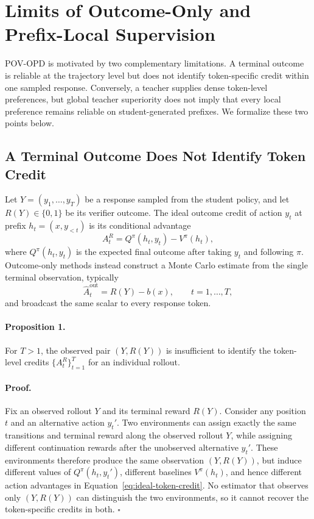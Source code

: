 \section{Limits of Outcome-Only and Prefix-Local Supervision}

POV-OPD is motivated by two complementary limitations. A terminal outcome is reliable at the trajectory level but does not identify token-specific credit within one sampled response. Conversely, a teacher supplies dense token-level preferences, but global teacher superiority does not imply that every local preference remains reliable on student-generated prefixes. We formalize these two points below.

\subsection{A Terminal Outcome Does Not Identify Token Credit}

Let $Y=(y_1,\ldots,y_T)$ be a response sampled from the student policy, and let $R(Y)\in\{0,1\}$ be its verifier outcome. The ideal outcome credit of action $y_t$ at prefix $h_t=(x,y_{<t})$ is its conditional advantage
\begin{equation}
A_t^R = Q^{\pi}(h_t,y_t)-V^{\pi}(h_t),
\label{eq:ideal-token-credit}
\end{equation}
where $Q^{\pi}(h_t,y_t)$ is the expected final outcome after taking $y_t$ and following $\pi$. Outcome-only methods instead construct a Monte Carlo estimate from the single terminal observation, typically
\begin{equation}
\widehat A_t^{\mathrm{out}}=R(Y)-b(x), \qquad t=1,\ldots,T,
\label{eq:outcome-broadcast}
\end{equation}
and broadcast the same scalar to every response token.

\paragraph{Proposition 1.}
For $T>1$, the observed pair $(Y,R(Y))$ is insufficient to identify the token-level credits $\{A_t^R\}_{t=1}^{T}$ for an individual rollout.

\paragraph{Proof.}
Fix an observed rollout $Y$ and its terminal reward $R(Y)$. Consider any position $t$ and an alternative action $y_t'$. Two environments can assign exactly the same transitions and terminal reward along the observed rollout $Y$, while assigning different continuation rewards after the unobserved alternative $y_t'$. These environments therefore produce the same observation $(Y,R(Y))$, but induce different values of $Q^{\pi}(h_t,y_t')$, different baselines $V^{\pi}(h_t)$, and hence different action advantages in Equation~\eqref{eq:ideal-token-credit}. No estimator that observes only $(Y,R(Y))$ can distinguish the two environments, so it cannot recover the token-specific credits in both. \hfill $\square$

